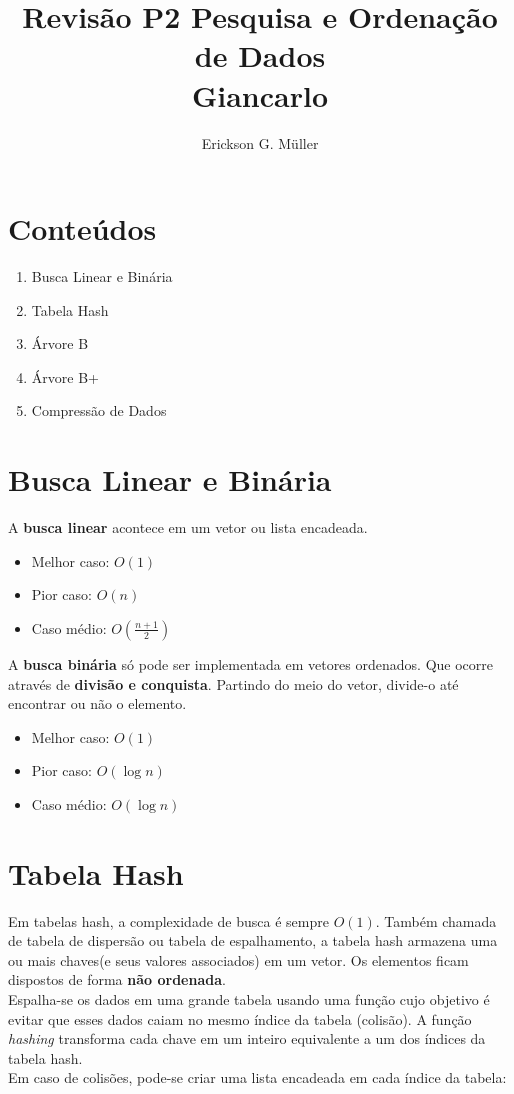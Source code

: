 \documentclass[•]{article}
\title{Revisão P2 Pesquisa e Ordenação de Dados\\Giancarlo}
\author{Erickson G. Müller}
\begin{document}
	\maketitle
	\section*{Conteúdos}
		\begin{enumerate}
			\item Busca Linear e Binária
			\item Tabela Hash
			\item Árvore B
			\item Árvore B+
			\item Compressão de Dados
		\end{enumerate}
	\newpage
	
	\section{Busca Linear e Binária}
		A \textbf{busca linear} acontece em um vetor ou lista encadeada.
		\begin{itemize}
			\item Melhor caso: $O(1)$
			\item Pior caso: $O(n)$
			\item Caso médio: $O(\frac{n+1}{2})$
		\end{itemize}
		A \textbf{busca binária} só pode ser implementada em vetores ordenados. Que ocorre através de \textbf{divisão e conquista}. Partindo do meio do vetor, divide-o até encontrar ou não o elemento.
		\begin{itemize}
			\item Melhor caso: $O(1)$
			\item Pior caso: $O(\log n)$
			\item Caso médio: $O(\log n)$
		\end{itemize}
		
	\section{Tabela Hash}
		Em tabelas hash, a complexidade de busca é sempre $O(1)$. Também chamada de tabela de dispersão ou tabela de espalhamento, a tabela hash armazena uma ou mais chaves(e seus valores associados) em um vetor. Os elementos ficam dispostos de forma \textbf{não ordenada}.\\
		Espalha-se os dados em uma grande tabela usando uma função cujo objetivo é evitar que esses dados caiam no mesmo índice da tabela (colisão). A função \textit{hashing} transforma cada chave em um inteiro equivalente a um dos índices da tabela hash.\\
		Em caso de colisões, pode-se criar uma lista encadeada em cada índice da tabela:
\end{document}
